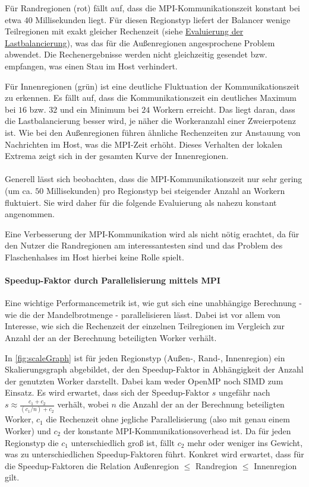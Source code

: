 Für Randregionen (rot) fällt auf, dass die MPI-Kommunikationszeit konstant bei etwa \( 40 \) Millisekunden liegt.
Für diesen Regionstyp liefert der Balancer wenige Teilregionen mit exakt gleicher Rechenzeit (siehe \hyperref[sec:lastbalancierung_eval]{Evaluierung der Lastbalancierung}), was das für die Außenregionen angesprochene Problem abwendet. Die Rechenergebnisse werden nicht gleichzeitig gesendet bzw. empfangen, was einen Stau im Host verhindert.

Für Innenregionen (grün) ist eine deutliche Fluktuation der Kommunikationszeit zu erkennen.
Es fällt auf, dass die Kommunikationszeit ein deutliches Maximum bei \( 16 \) bzw. \( 32 \) und ein Minimum bei \( 24 \) Workern erreicht.
Das liegt daran, dass die Lastbalancierung besser wird, je näher die Workeranzahl einer Zweierpotenz ist.
Wie bei den Außenregionen führen ähnliche Rechenzeiten zur Anstauung von Nachrichten im Host, was die MPI-Zeit erhöht.
Dieses Verhalten der lokalen Extrema zeigt sich in der gesamten Kurve der Innenregionen.
\\
\\
Generell lässt sich beobachten, dass die MPI-Kommunikationszeit nur sehr gering (um ca. \( 50 \) Millisekunden) pro Regionstyp bei steigender Anzahl an Workern fluktuiert. Sie wird daher für die folgende Evaluierung als nahezu konstant angenommen.

Eine Verbesserung der MPI-Kommunikation wird als nicht nötig erachtet, da für den Nutzer die Randregionen am interessantesten sind und das Problem des Flaschenhalses im Host hierbei keine Rolle spielt.

\paragraph{Speedup-Faktor durch Parallelisierung mittels MPI}

Eine wichtige Performancemetrik ist, wie gut sich eine unabhängige Berechnung - wie die der Mandelbrotmenge - parallelisieren lässt. Dabei ist vor allem von Interesse, wie sich die Rechenzeit der einzelnen Teilregionen im Vergleich zur Anzahl der an der Berechnung beteiligten Worker verhält.

In \autoref{fig:scaleGraph} ist für jeden Regionstyp (Außen-, Rand-, Innenregion) ein Skalierungsgraph abgebildet, der den Speedup-Faktor in Abhängigkeit der Anzahl der genutzten Worker darstellt. Dabei kam weder OpenMP noch SIMD zum Einsatz. Es wird erwartet, dass sich der Speedup-Faktor \( s \) ungefähr nach \( s \approx \frac{c_1 + c_2}{(c_1/n) + c_2} \) verhält, wobei \( n \) die Anzahl der an der Berechnung beteiligten Worker, \( c_1 \) die Rechenzeit ohne jegliche Parallelisierung (also mit genau einem Worker) und \( c_2 \) der konstante MPI-Kommunikationsoverhead ist. Da für jeden Regionstyp die \( c_1 \) unterschiedlich groß ist, fällt \( c_2 \) mehr oder weniger ins Gewicht, was zu unterschiedlichen Speedup-Faktoren führt. Konkret wird erwartet, dass für die Speedup-Faktoren die Relation Außenregion \( \leqslant \) Randregion \( \leqslant \) Innenregion gilt.

